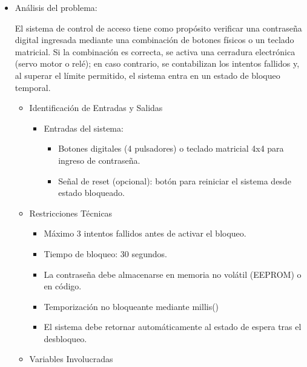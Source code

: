 

\begin{itemize}
    
    \item Análisis del problema:
    
     El sistema de control de acceso tiene como propósito verificar una contraseña digital ingresada mediante una combinación de botones físicos o un teclado matricial. Si la combinación es correcta, se activa una cerradura electrónica (servo motor o relé); en caso contrario, se contabilizan los intentos fallidos y, al superar el límite permitido, el sistema entra en un estado de bloqueo temporal.
     
        \begin{itemize}
             \item Identificación de Entradas y Salidas
                  \begin{itemize}       
                      \item Entradas del sistema:
                    
                            \begin{itemize}
                                 \item  Botones digitales (4 pulsadores) o teclado matricial 4x4 para ingreso de contraseña.

                                 \item Señal de reset (opcional): botón para reiniciar el sistema desde estado bloqueado.                      
                             \end{itemize}  
                             
                  \end{itemize}     

             \item Restricciones Técnicas
                     \begin{itemize}
                            \item Máximo 3 intentos fallidos antes de activar el bloqueo.
                            
                            \item Tiempo de bloqueo: 30 segundos.

                            \item La contraseña debe almacenarse en memoria no volátil (EEPROM) o en código.
                            
                            \item Temporización no bloqueante mediante millis()

                            \item El sistema debe retornar automáticamente al estado de espera tras el desbloqueo.
                     \end{itemize}
                     
             \item Variables Involucradas
                 
          
       \end{itemize}  
\end{itemize}


